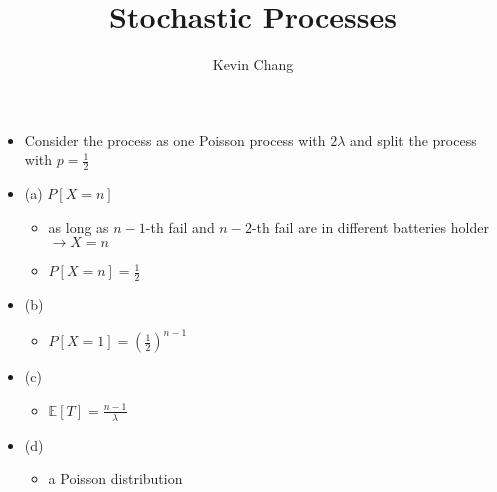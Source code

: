 \documentclass[a4paper]{article}
\title{Stochastic Processes}
\author{Kevin Chang}
\begin{document}
\maketitle

\section{}
\begin{itemize}
\begin{figure} [H]
    \texttt{[image: question/1.png]}
\end{figure}
    \item Consider the process as one Poisson process with $2 \lambda$ and split the process with $p = \frac{1}{2}$
    \item (a) $P[X=n]$
        \begin{itemize}
            \item as long as $n-1$-th fail and $n-2$-th fail are in different batteries holder $\rightarrow X = n$
            \item $P[X=n] = \frac{1}{2}$
        \end{itemize}
    \item (b)
        \begin{itemize}
            \item $P[X=1] = (\frac{1}{2})^{n-1}$
        \end{itemize}
    \item (c)
        \begin{itemize}
            \item $\mathbb{E}[T] = \frac{n-1}{\lambda}$
        \end{itemize}
    \item (d)
        \begin{itemize}
            \item a Poisson distribution
        \end{itemize}
\end{itemize}
\end{document}
